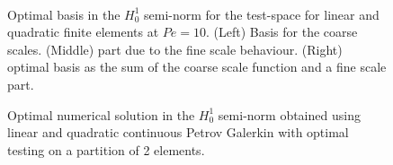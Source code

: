 \begin{figure}
	\centering
	 \\
	\caption{Optimal basis in the $H^1_0$ semi-norm for the test-space for linear and quadratic finite elements at $Pe=10$. (Left) Basis for the coarse scales. (Middle)  part due to the fine scale behaviour. (Right) optimal basis as the sum of the coarse scale function and a fine scale part.}
	\label{fig:optimaltestfunc2}
\end{figure}

\begin{figure}
	\centering
	\caption{Optimal numerical solution in the $H^1_0$ semi-norm obtained using linear and quadratic continuous Petrov Galerkin with optimal testing on a partition of 2 elements.}
	\label{fig:optimaltestfunc3}
\end{figure}


